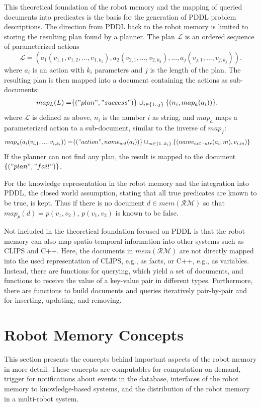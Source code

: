 This theoretical foundation of the robot memory and the mapping of
queried documents into predicates is the basis for the generation of
PDDL problem descriptions. The direction from PDDL back to the robot
memory is limited to storing the resulting plan found by a
planner. The plan $\mathcal{L}$ is an ordered sequence of
parameterized actions
$$\mathcal{L}=(a_1(v_{1,1},v_{1,2},...,v_{1,k_1}),a_2(v_{2,1},...,v_{2,k_2}),...,a_j(v_{j,1},...,v_{j,k_j})) \text{.}$$
where $a_i$ is an action with $k_i$ parameters and $j$ is the length
of the plan. The resulting plan is then mapped into a document
containing the actions as sub-documents:
\begin{align*}
  map_L(L)=&\{("plan", "success")\} \cup_{i \in \{1..j\}}\{(n_i, map_a(a_i))\} \text{,}
\end{align*}
where $\mathcal{L}$ is defined as above, $n_i$ is the number $i$ as
string, and $map_a$ maps a parameterized action to a sub-document,
similar to the inverse of $map_f$:
\begin{align*}
  map_a(a_i(v_{i,1},...,v_{i,k_i}))= &\{("action", name_{act}(a_i))\} 
\cup_{m \in \{1..k_i\}}\{(name_{act-atr}(a_i,m), v_{i,m})\}
\end{align*}
If the planner can not find any plan, the result is mapped to the
document $\{("plan", "fail")\}$.

For the knowledge representation in the robot memory and the
integration into PDDL, the closed world assumption, stating that all
true predicates are known to be true, is kept. Thus if 
there is no document $d\in mem(\mathcal{RM})$ so that
$map_p(d)=p(v_1,v_2)$, $p(v_1,v_2)$ is known to be false.

\bigskip

Not included in the theoretical foundation focused on
PDDL is that the robot memory can also map spatio-temporal information into
other systems such as CLIPS and C++. Here, the documents in
$mem(\mathcal{RM})$ are not directly mapped into the used
representation of CLIPS, e.g., as facts, or C++, e.g., as
variables. Instead, there are functions for querying, which yield a
set of documents, and functions to receive the value of a key-value
pair in different types. Furthermore, there are functions to build
documents and queries iteratively pair-by-pair and for inserting,
updating, and removing.

\section{Robot Memory Concepts}
\label{sec:concepts}
This section presents the concepts behind important aspects of the
robot memory in more detail. These concepts are computables for
computation on demand, trigger for notifications about events in the
database, interfaces of the robot memory to knowledge-based systems,
and the distribution of the robot memory in a multi-robot system.

